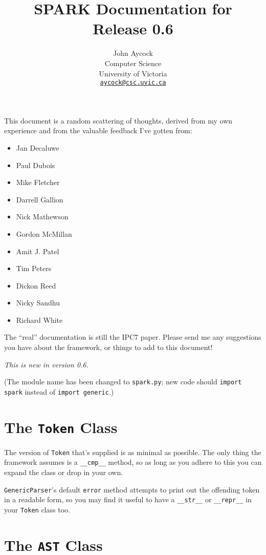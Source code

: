 \documentclass{article}
\title{SPARK Documentation for Release 0.6}
\author{John Aycock \\ Computer Science \\ University of Victoria \\
	\href{mailto:aycock@csc.uvic.ca}{\texttt{aycock@csc.uvic.ca}}}
\newcommand{\code}[1]{\texttt{#1}}
\begin{document}
\maketitle

This document is a random scattering of thoughts, derived from
my own experience and from the valuable feedback I've gotten from:

\begin{itemize}
\item Jan Decaluwe
\item Paul Dubois
\item Mike Fletcher
\item Darrell Gallion
\item Nick Mathewson
\item Gordon McMillan
\item Amit J. Patel
\item Tim Peters
\item Dickon Reed
\item Nicky Sandhu
\item Richard White
\end{itemize}

The ``real'' documentation is still the IPC7 paper.  Please send
me any suggestions you have about the framework, or things to add
to this document!

\emph{This is new in version 0.6.}

(The module name has been changed to \code{spark.py}; new code should
\code{import spark} instead of \code{import generic}.)

\section{The \code{Token} Class}

The version of \code{Token} that's supplied is as minimal as possible.  The
only thing the framework assumes is a \code{\_\_cmp\_\_} method, so as long as
you adhere to this you can expand the class or drop in your own.

\code{GenericParser}'s default \code{error} method attempts to print out
the offending token in a readable form, so you may find it useful to have
a \code{\_\_str\_\_} or \code{\_\_repr\_\_} in your \code{Token} class too.

\section{The \code{AST} Class}
\end{document}
